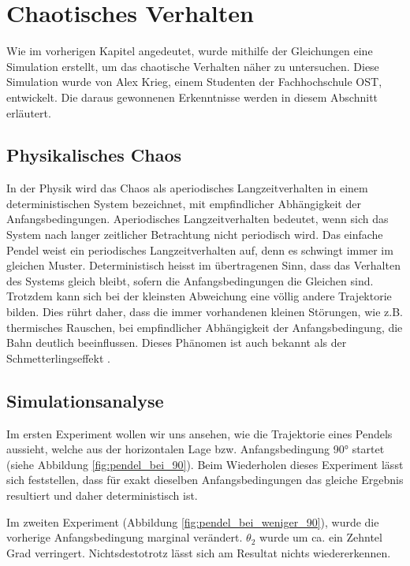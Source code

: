 \section{Chaotisches Verhalten}
Wie im vorherigen Kapitel angedeutet, wurde mithilfe der Gleichungen eine Simulation erstellt,
um das chaotische Verhalten näher zu untersuchen.
Diese Simulation wurde von Alex Krieg, einem Studenten der Fachhochschule OST, entwickelt.
Die daraus gewonnenen Erkenntnisse werden in diesem Abschnitt erläutert.


\subsection{Physikalisches Chaos}
In der Physik wird das Chaos als aperiodisches Langzeitverhalten in einem deterministischen
System bezeichnet, mit empfindlicher Abhängigkeit der Anfangsbedingungen.
Aperiodisches Langzeitverhalten bedeutet, wenn sich das System nach langer zeitlicher Betrachtung
nicht periodisch wird.
Das einfache Pendel weist ein periodisches Langzeitverhalten auf,
denn es schwingt immer im gleichen Muster.
Deterministisch heisst im übertragenen Sinn, dass das Verhalten des Systems gleich bleibt,
sofern die Anfangsbedingungen die Gleichen sind.
Trotzdem kann sich bei der kleinsten Abweichung eine völlig andere Trajektorie bilden.
Dies rührt daher, dass die immer vorhandenen kleinen Störungen, wie z.B. thermisches Rauschen,
bei empfindlicher Abhängigkeit der Anfangsbedingung, die Bahn deutlich beeinflussen.
Dieses Phänomen ist auch bekannt als der Schmetterlingseffekt \cite{doppelpendel:schmetterlingseffekt}.

\subsection{Simulationsanalyse}
Im ersten Experiment wollen wir uns ansehen, wie die Trajektorie eines Pendels aussieht,
welche aus der horizontalen Lage bzw. Anfangsbedingung 90° startet
(siehe Abbildung \ref{fig:pendel_bei_90}).
Beim Wiederholen dieses Experiment lässt sich feststellen, dass für exakt dieselben Anfangsbedingungen
das gleiche Ergebnis resultiert und daher deterministisch ist.

Im zweiten Experiment (Abbildung \ref{fig:pendel_bei_weniger_90}), wurde die vorherige
Anfangsbedingung marginal verändert.
\(\theta_2\) wurde um ca. ein Zehntel Grad verringert.
Nichtsdestotrotz lässt sich am Resultat nichts wiedererkennen.

